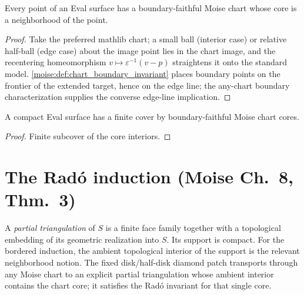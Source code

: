 \begin{lemma}
\label{moise:lem:chart_extraction}
\leanok
{}
Every point of an Eval surface has a boundary-faithful Moise chart whose core
is a neighborhood of the point.
\end{lemma}

\begin{proof}
\leanok
Take the preferred mathlib chart; a small ball (interior case) or relative
half-ball (edge case) about the image point lies in the chart image, and the
recentering homeomorphism $v\mapsto\varepsilon^{-1}(v-p)$ straightens it onto
the standard model.  \ref{moise:def:chart_boundary_invariant} places boundary
points on the frontier of the extended target, hence on the edge line; the
any-chart boundary characterization supplies the converse edge-line
implication.
\end{proof}

\begin{lemma}
\label{moise:lem:finite_chart_cover}
\leanok
{}
A compact Eval surface has a finite cover by boundary-faithful Moise chart
cores.
\end{lemma}

\begin{proof}
\leanok
Finite subcover of the core interiors.
\end{proof}

\section{The Rad\'o induction (Moise Ch.~8, Thm.~3)}

\begin{definition}
\label{moise:def:partial_triangulation}
\leanok
{}
A \emph{partial triangulation} of $S$ is a finite face family together with a
topological embedding of its geometric realization into $S$.  Its support is
compact.  For the bordered induction, the ambient topological interior of the
support is the relevant neighborhood notion.
The fixed disk/half-disk diamond patch transports through any Moise chart to
an explicit partial triangulation whose ambient interior contains the chart
core; it satisfies the Rad\'o invariant for that single core.
\end{definition}


